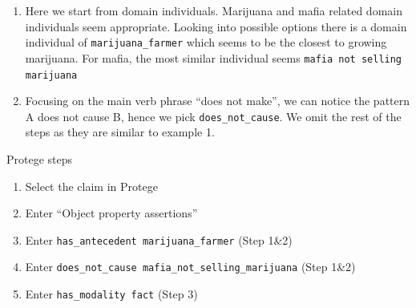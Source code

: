 \begin{enumerate}[label=\textbf{Step \arabic*.}, leftmargin=2cm, itemsep=0.5cm]
\item Here we start from domain individuals. Marijuana and mafia related domain
	individuals seem appropriate. Looking into possible options there is a
		domain individual of \texttt{marijuana\_farmer} which seems to be the
		closest to growing marijuana. For mafia, the most similar
		individual seems \texttt{mafia not selling marijuana}
\item  Focusing on the main verb phrase ``does not make'', we can notice the
	pattern A does not cause B, hence we pick \texttt{does\_not\_cause}. We omit the
		rest of the steps as they are similar to example 1. 
\end{enumerate}
Protege steps
\begin{enumerate}
\item Select the claim in Protege
\item Enter “Object property assertions”
\item Enter \texttt{has\_antecedent marijuana\_farmer} (Step 1\&2)
\item Enter \texttt{does\_not\_cause mafia\_not\_selling\_marijuana} (Step 1\&2)
\item Enter \texttt{has\_modality fact} (Step 3)
\end{enumerate}
